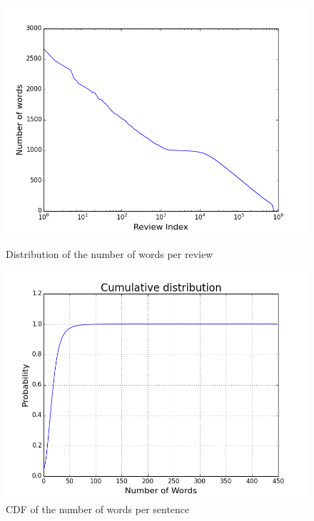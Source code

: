 \documentclass{article}
\begin{document}
\begin{figure}
\centering
\begin{minipage}{.6\textwidth}
  
  \includegraphics[width=\linewidth]{NbOfWordsPerReview.png} 
 \caption{Distribution of the number of words per review} 
  \label{NbWordsPerReview}
\end{minipage}%
\centering
\begin{minipage}{.6\textwidth}
  
  \includegraphics[width=\linewidth]{NbOfWordsPerSentences.png}
  \caption{CDF of the number of words per sentence} 
  \label{NbOfWordsPerSentences}
\end{minipage}
\end{figure}
\end{document}
